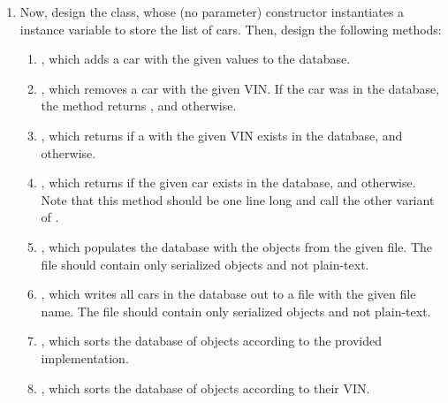\begin{enumerate}[label=(\alph*)]
    \item Now, design the  class, whose (no parameter) constructor instantiates a  instance variable to store the list of cars. Then, design the following methods:
    \begin{enumerate}[label=(\roman*)]
        \item {}, which adds a car with the given values to the database.
        \item {}, which removes a car with the given VIN. If the car was in the database, the method returns , and  otherwise.
        \item {}, which returns  if a  with the given VIN exists in the database, and  otherwise. 
        \item {}, which returns  if the given car exists in the database, and  otherwise. Note that this method should be one line long and call the other variant of .
        \item {}, which populates the database with the  objects from the given file. The file should contain only serialized  objects and not plain-text. 
        \item {}, which writes all cars in the database out to a file with the given file name. The file should contain only serialized  objects and not plain-text.
        \item {}, which sorts the database of  objects according to the provided  implementation.
        \item {}, which sorts the database of  objects according to their VIN.
    \end{enumerate}
\end{enumerate}


